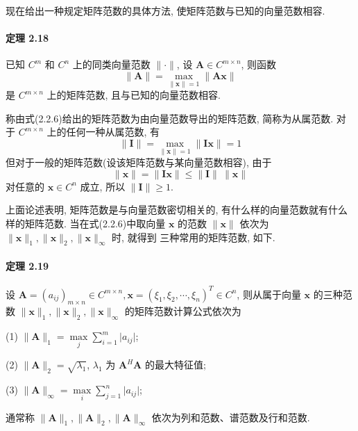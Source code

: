 \par 现在给出一种规定矩阵范数的具体方法, 使矩阵范数与已知的向量范数相容.

\paragraph*{定理 2.18} 已知 $C^m$ 和 $C^n$ 上的同类向量范数 $\lVert \bm{\cdot} \rVert$, 设 $\bm{A} \in C^{m\times n}$, 则函数
\begin{equation}
    \lVert \bm{A} \rVert = \mathop{\max}_{\lVert \bm{x} \rVert = 1} \lVert \bm{Ax} \rVert
    \tag{2.2.6}
\end{equation}
是 $C^{m\times n}$ 上的矩阵范数, 且与已知的向量范数相容.

\par 称由式(2.2.6)给出的矩阵范数为由向量范数导出的矩阵范数, 简称为从属范数. 对于 $C^{m\times n}$ 上的任何一种从属范数, 有
$$
    \lVert \bm{I} \rVert = \mathop{\max}\limits_{\lVert \bm{x} \rVert = 1} \lVert \bm{Ix} \rVert = 1
$$
但对于一般的矩阵范数(设该矩阵范数与某向量范数相容), 由于
$$
    \lVert \bm{x} \rVert = \lVert \bm{Ix} \rVert \leqslant \lVert \bm{I} \rVert \ \lVert \bm{x} \rVert
$$
对任意的 $\bm{x} \in C^n$ 成立, 所以 $\lVert \bm{I} \rVert \geqslant 1$.

\par 上面论述表明, 矩阵范数是与向量范数密切相关的, 有什么样的向量范数就有什么
样的矩阵范数. 当在式(2.2.6)中取向量 $\bm{x}$ 的范数 $\lVert \bm{x} \rVert$ 依次为 $\lVert \bm{x} \rVert _1, \lVert \bm{x} \rVert _2, \lVert \bm{x} \rVert _\infty$ 时, 就得到
三种常用的矩阵范数, 如下.

\paragraph*{定理 2.19} 设 $\bm{A} = (a_{ij})_{m\times n} \in C^{m\times n}, \bm{x} = (\xi_1, \xi_2, \cdots, \xi_n)^T \in C^n$, 则从属于向量 $\bm{x}$ 的三种范数 $\lVert \bm{x} \rVert _1, \lVert \bm{x} \rVert _2, \lVert \bm{x} \rVert _\infty$ 的矩阵范数计算公式依次为
\par (1) $\lVert \bm{A} \rVert _1 = \mathop{\max}\limits_{j} \sum\limits_{i = 1}^m \lvert a_{ij} \rvert$;
\par (2) $\lVert \bm{A} \rVert _2 = \sqrt{\lambda_1}$, $\lambda_1$ 为 $\bm{A}^{H}\bm{A}$ 的最大特征值;
\par (3) $\lVert \bm{A} \rVert _\infty = \mathop{\max}\limits_i \sum\limits_{j = 1}^n \lvert a_{ij} \rvert$;
\par 通常称 $\lVert \bm{A} \rVert _1, \lVert \bm{A} \rVert _2, \lVert \bm{A} \rVert _\infty$ 依次为列和范数、谱范数及行和范数.

